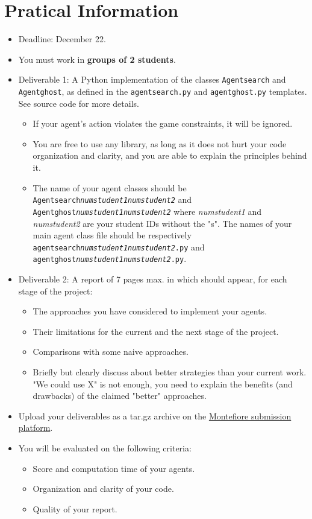\documentclass[12pt,a4paper,BCOR12mm, headexclude, footexclude, twoside, openright]{scrartcl}
\newcommand*{\TakeFourierOrnament}[1]{{%
\fontencoding{U}\fontfamily{futs}\selectfont\char#1}}
\newcommand*{\danger}{\TakeFourierOrnament{66}}
\numberwithin{equation}{section} %
\numberwithin{figure}{section} %
\numberwithin{table}{section} %
\begin{document}
\section{Pratical Information}
\begin{itemize}

    \item Deadline: December 22.
    \item You must work in {\bf groups of 2 students}.
    \item Deliverable 1: A Python implementation of the classes \texttt{Agentsearch} and \texttt{Agentghost}, as defined in the  \texttt{agentsearch.py} and \texttt{agentghost.py} templates. See source code for more details.
    \begin{itemize}
    	\item \danger If your agent's action violates the game constraints, it will be ignored.
        \item You are free to use any library, as long as it does not hurt your code organization and clarity, and you are able to explain the principles behind it.
        \item The name of your agent classes should be \texttt{Agentsearch\emph{numstudent1}\emph{numstudent2}} and \texttt{Agentghost\emph{numstudent1}\emph{numstudent2}} where \emph{numstudent1} and \emph{numstudent2} are your student IDs without the "s". The names of your main agent class file should be respectively \texttt{agentsearch\emph{numstudent1}\emph{numstudent2}.py} and \texttt{agentghost\emph{numstudent1}\emph{numstudent2}.py}.
    \end{itemize}
    \item Deliverable 2: A report of 7 pages max. in which should appear, for each stage of the project:
    	\begin{itemize}
        	\item The approaches you have considered to implement your agents.
            \item Their limitations for the current and the next stage of the project.
            \item Comparisons with some naive approaches.
            \item Briefly but clearly discuss about better strategies than your current work. "We could use X" is not enough, you need to explain the benefits (and drawbacks) of the claimed "better" approaches.
        \end{itemize}
    \item Upload your deliverables as a tar.gz archive on the \href{http://submit.montefiore.ulg.ac.be/student/viewprojects/INFO8006}{Montefiore submission platform}.

	\item You will be evaluated on the following criteria:
    \begin{itemize}
		\item Score and computation time of your agents.
        \item Organization and clarity of your code.
        \item Quality of your report.
	\end{itemize}
\end{itemize}
\end{document}
